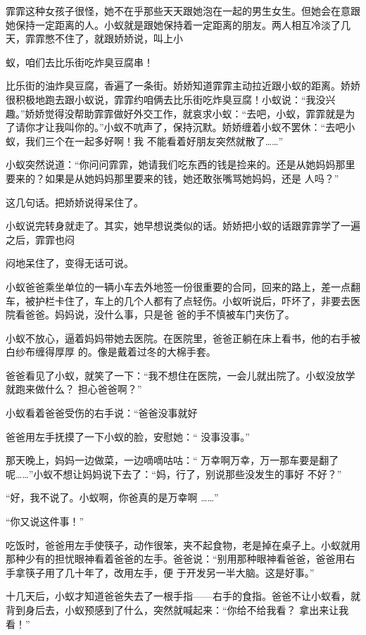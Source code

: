 \documentclass{article}
\begin{document}
霏霏这种女孩子很怪，她不在乎那些天天跟她泡在一起的男生女生。但她会在意跟她保持一定距离的人。小蚁就是跟她保持着一定距离的朋友。两人相互冷淡了几天，霏霏憋不住了，就跟娇娇说，叫上小
\newpage

蚁，咱们去比乐街吃炸臭豆腐串！ 

比乐街的油炸臭豆腐，香遍了一条街。娇娇知道霏霏主动拉近跟小蚁的距离。娇娇很积极地跑去跟小蚁说，霏霏约咱俩去比乐街吃炸臭豆腐！小蚁说：“我没兴趣。”娇娇觉得没帮助霏霏做好外交工作，就哀求小蚁：“去吧，小蚁，霏霏就是为了请你才让我叫你的。”小蚁不吭声了，保持沉默。娇娇缠着小蚁不罢休：“去吧小蚁，我们三个在一起多好啊！我
不能看着好朋友突然就散了……” 

小蚁突然说道：“你问问霏霏，她请我们吃东西的钱是捡来的。还是从她妈妈那里要来的？如果是从她妈妈那里要来的钱，她还敢张嘴骂她妈妈，还是
人吗？” 


这几句话。把娇娇说得呆住了。 

小蚁说完转身就走了。其实，她早想说类似的话。娇娇把小蚁的话跟霏霏学了一遍之后，霏霏也闷

\newpage
闷地呆住了，变得无话可说。 

小蚁爸爸乘坐单位的一辆小车去外地签一份很重要的合同，回来的路上，差一点翻车，被护栏卡住了，车上的几个人都有了点轻伤。小蚁听说后，吓坏了，非要去医院看爸爸。妈妈说，没什么事，只是爸
爸的手不慎被车门夹伤了。 

小蚁不放心，逼着妈妈带她去医院。在医院里，爸爸正躺在床上看书，他的右手被白纱布缠得厚厚
的。像是戴着过冬的大棉手套。 

爸爸看见了小蚁，就笑了一下：“我不想住在医院，一会儿就出院了。小蚁没放学就跑来做什么？
担心爸爸啊？” 

小蚁看着爸爸受伤的右手说：“爸爸没事就好

爸爸用左手抚摸了一下小蚁的脸，安慰她：“
没事没事。” 

那天晚上，妈妈一边做菜，一边嘀嘀咕咕：“
\newpage
万幸啊万幸，万一那车要是翻了呢……”小蚁不想让妈妈说下去了：“妈，行了，别说那些没发生的事好
不好？” 

“好，我不说了。小蚁啊，你爸真的是万幸啊
……” 


“你又说这件事！” 

吃饭时，爸爸用左手使筷子，动作很笨，夹不起食物，老是掉在桌子上。小蚁就用那种少有的担忧眼神看着爸爸的左手。爸爸说：“别用那种眼神看爸爸，爸爸用右手拿筷子用了几十年了，改用左手，便
于开发另一半大脑。这是好事。” 

十几天后，小蚁才知道爸爸失去了一根手指——右手的食指。爸爸不让小蚁看，就背到身后去，小蚁预感到了什么，突然就喊起来：“你给不给我看？
拿出来让我看！” 
\end{document}
